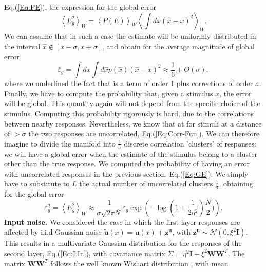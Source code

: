 \documentclass[a4paper]{article}%
\begin{document}
Eq.(\ref{Eq:PE}), the expression for the global error
\begin{equation}
\left\langle E^{2}_{g}\right\rangle_{W} = \left\langle P(E)\right\rangle_{W}
\left\langle\int dx (\hat{x}-x)^{2}\right\rangle_{W}.
\end{equation}
We can assume that in such a case the estimate will be uniformly distributed
in the interval $\hat{x} \not \in [x-\sigma,x+\sigma]$, and obtain for the
average magnitude of global error
\begin{equation}
\bar{\varepsilon}_{g} = \int dx \int d \hat{x} p(\hat{x}) \left(\hat{x}-x\right)^{2}
\approx\frac{1}{6} + O(\sigma),
\end{equation}
where we underlined the fact that is a term of order 1 plus corrections of
order $\sigma$. Finally, we have to compute the probability that, given a
stimulus $x$, the error will be global. This quantity again will not depend
from the specific choice of the stimulus. Computing this probability
rigorously is hard, due to the correlations between nearby responses.
Nevertheless, we know that at for stimuli at a distance of $> \sigma$  the two responses are uncorrelated, Eq.(\ref{Eq:Corr-Fun}). We can therefore imagine to divide the manifold into
$\frac{1}{\sigma}$ discrete correlation 'clusters' of responses: we will have
a global error when the estimate of the stimulus belong to a cluster other
than the true response. We computed the probability of having an error with
uncorrelated responses in the previous section, Eq.(\ref{Eq:GE}). We simply
have to substitute to $L$ the actual number of uncorrelated clusters $\frac
{1}{\sigma}$, obtaining for the global error
\begin{equation}
\varepsilon_g^2 = \left\langle E_{g}^{2}\right\rangle_{W} \approx\frac{1
}{\sigma\sqrt{2\pi N}}\bar{\varepsilon}_{g} \exp{\left(-\log\left(1 + \frac{1}
{2\eta^{2}}\right)\frac{N}{2} )\right)}.
\end{equation}
\newline\newline\textbf{Input noise.} We considered the case in which the
first layer responses are affected by i.i.d Gaussian noise $\mathbf{\tilde
u}(x) = \mathbf{u}(x) + \mathbf{z^{u}} $, with $\mathbf{z^{u}} \sim
\mathcal{N}(0,\xi^{2}\mathbf{I})$. This results in a multivariate Gaussian
distribution for the responses of the second layer, Eq.(\ref{Eq:LIn}), with
covariance matrix $\Sigma= \eta^{2} \mathbf{I} + \xi^{2} \mathbf{W} \mathbf{W}^{T}.$ The matrix $\mathbf{W}\mathbf{W}^{T}$ follows the well known
Wishart distribution \cite[]{Livan2017IntroductionPractice}, with mean
\end{document}
